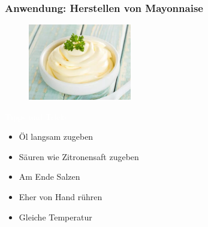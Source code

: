 \documentclass{beamer} %
\begin{document}
\begin{frame}

\frametitle{Anwendung: Herstellen von Mayonnaise}
\begin{figure}
\centering
\includegraphics[width = 0.4\textwidth]{Mayonnaise.jpg}
\end{figure}
\begin{block}{\textcolor{white}{Tipps und Tricks}}
\begin{itemize}
\item Öl langsam zugeben
\item Säuren wie Zitronensaft zugeben
\item Am Ende Salzen
\item Eher von Hand rühren
\item Gleiche Temperatur
\end{itemize}
\end{block}

\end{frame}
\end{document}

